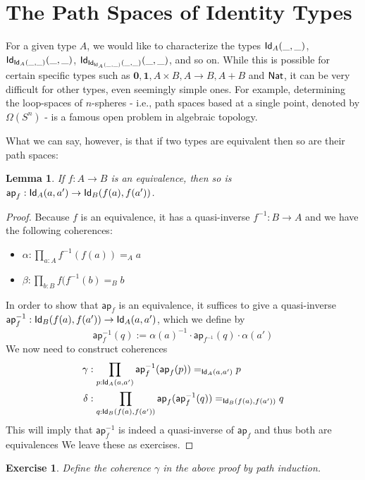 \documentclass[12pt]{article}
\newcommand{\ap}{\mathsf{ap}}
\newtheorem*{exercise}{Exercise}
\newtheorem*{lemma}{Lemma}
\begin{document}
\section{The Path Spaces of Identity Types}\label{}

For a given type $A$, we would like to characterize the types $\mathsf{Id}_{A}(\_,\_)$,
$\mathsf{Id}_{\mathsf{Id}_{A}(\_,\_)}(\_,\_)$, $\mathsf{Id}_{\mathsf{Id}_{\mathsf{Id}_{A}(\_,\_)}(\_,\_)}(\_,\_)$, and so on. While this is possible for certain specific types such as $\mathbf{0}, \mathbf{1}, A \times B, A \to B, A + B$ and $\mathsf{Nat}$, it can be very difficult for other types, even seemingly simple ones. For example, determining the loop-spaces of $n$-spheres - i.e., path spaces based at a single point, denoted by $\Omega(S^n)$ - is a famous open problem in algebraic topology. 

What we can say, however, is that if two types are equivalent then so are their path spaces:

\begin{lemma} If $f : A \to B$ is an equivalence, then so is \
$\ap_f:\Id{A}(a,a')\to\Id{B}(f(a),f(a'))$.
\end{lemma}

\begin{proof}
Because $f$ is an equivalence, it has a quasi-inverse $f^{-1}:B\to A$ and we have the following coherences:

\begin{itemize}
\item $\alpha:\prod_{a:A} f^{-1}(f(a)) =_A a$
\item $\beta:\prod_{b:B} f(f^{-1}(b) =_B b$
\end{itemize}

In order to show that $\ap_f$ is an equivalence, it suffices to give a
quasi-inverse $\ap_f^{-1}:\Id{B}(f(a),f(a'))\to\Id{A}(a,a')$, which we define by
\[
\ap_f^{-1}(q) := \alpha(a)^{-1} \cdot \ap_{f^{-1}}(q) \cdot \alpha(a')
\]
We now need to construct coherences
\begin{align*}
\gamma&:\prod_{p:\Id{A}(a,a')}\ap_f^{-1}(\ap_f(p)) =_{\Id{A}(a,a')} p \\
\delta&:\prod_{q:\Id{B}(f(a),f(a'))}\ap_f(\ap_f^{-1}(q)) =_{\Id{B}(f(a),f(a'))} q
\end{align*}
This will imply that $\ap_f^{-1}$ is indeed a quasi-inverse of $\ap_f$ and thus both are equivalences We leave these as exercises.
\end{proof}

\begin{exercise} Define the coherence $\gamma$ in the above proof by path induction.
\end{exercise}
\end{document}
